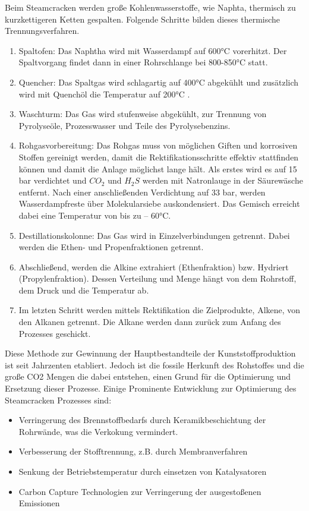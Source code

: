 \documentclass[12pt,a4paper,bibtotocnumbered,liststotocnumbered]{scrreprt}
\begin{document}
Beim Steamcracken werden große Kohlenwasserstoffe, wie Naphta, thermisch zu kurzkettigeren Ketten gespalten. Folgende Schritte bilden dieses thermische Trennungsverfahren.  
\begin{enumerate}
\item Spaltofen: Das Naphtha wird mit Wasserdampf auf 600°C vorerhitzt. Der Spaltvorgang findet dann in einer Rohrschlange bei 800-850°C statt.
\item Quencher: Das Spaltgas wird schlagartig auf 400°C abgekühlt und zusätzlich wird mit Quenchöl die Temperatur auf 200°C . 
\item Waschturm: Das Gas wird stufenweise abgekühlt, zur Trennung von Pyrolyseöle, Prozesswasser und Teile des Pyrolysebenzins. 
\item Rohgasvorbereitung: Das Rohgas muss von möglichen Giften und korrosiven Stoffen gereinigt werden, damit die Rektifikationsschritte effektiv stattfinden können und damit die Anlage möglichst lange hält. Als erstes wird es auf 15 bar verdichtet und $CO_2$ und $H_2S$ werden mit Natronlauge in der Säurewäsche entfernt. Nach einer anschließenden Verdichtung auf 33 bar, werden Wasserdampfreste über Molekularsiebe auskondensiert. Das Gemisch erreicht dabei eine Temperatur von bis zu – 60°C. 
\item Destillationskolonne: Das Gas wird in Einzelverbindungen getrennt. Dabei werden die Ethen- und Propenfraktionen getrennt. 
\item Abschließend, werden die Alkine extrahiert (Ethenfraktion) bzw. Hydriert (Propylenfraktion). Dessen Verteilung und Menge hängt von dem Rohrstoff, dem Druck und die Temperatur ab. 
\item Im letzten Schritt werden mittels Rektifikation die Zielprodukte, Alkene, von den Alkanen getrennt. Die Alkane werden dann zurück zum Anfang des Prozesses geschickt. \cite{Weinkraut}
\end{enumerate}

Diese Methode zur Gewinnung der Hauptbestandteile der Kunststoffproduktion ist seit Jahrzenten etabliert. Jedoch ist die fossile Herkunft des Rohstoffes und die große CO2 Mengen die dabei entstehen, einen Grund für die Optimierung und Ersetzung dieser Prozesse. 
Einige Prominente Entwicklung zur Optimierung des Steamcracken Prozesses sind:
\begin{itemize}
\item Verringerung des Brennstoffbedarfs durch Keramikbeschichtung der Rohrwände, was die Verkokung vermindert. \cite{Tao}
\item Verbesserung der Stofftrennung, z.B. durch Membranverfahren
\item Senkung der Betriebstemperatur durch einsetzen von Katalysatoren 
\item Carbon Capture Technologien zur Verringerung der ausgestoßenen Emissionen \cite{Schneider}
\end{itemize}
\end{document}
